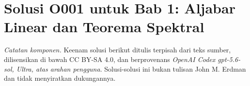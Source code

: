\section*{Solusi O001 untuk Bab 1: Aljabar Linear dan Teorema Spektral}
\noindent\textit{Catatan komponen.}
Keenam solusi berikut ditulis terpisah dari teks sumber, dilisensikan di bawah
CC BY-SA 4.0, dan berprovenans
\emph{OpenAI Codex gpt-5.6-sol, Ultra, atas arahan pengguna}.
Solusi-solusi ini bukan tulisan John M. Erdman dan tidak menyiratkan dukungannya.


